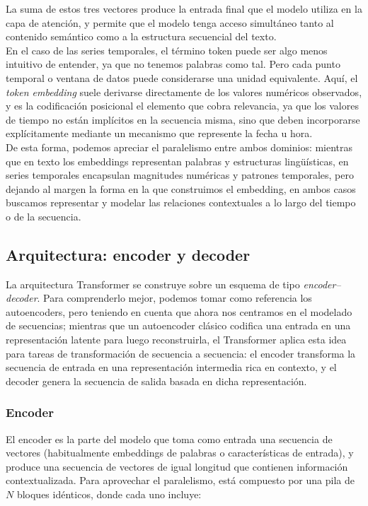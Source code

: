 La suma de estos tres vectores produce la entrada final que el modelo utiliza en la capa de atención, y permite que el modelo tenga acceso simultáneo tanto al contenido semántico como a la estructura secuencial del texto.\\

En el caso de las series temporales, el término token puede ser algo menos intuitivo de entender, ya que no tenemos palabras como tal. Pero cada punto temporal o ventana de datos puede considerarse una unidad equivalente. Aquí, el \textit{token embedding} suele derivarse directamente de los valores numéricos observados, y es la codificación posicional el elemento que cobra relevancia, ya que los valores de tiempo no están implícitos en la secuencia misma, sino que deben incorporarse explícitamente mediante un mecanismo que represente la fecha u hora.\\

De esta forma, podemos apreciar el paralelismo entre ambos dominios: mientras que en texto los embeddings representan palabras y estructuras lingüísticas, en series temporales encapsulan magnitudes numéricas y patrones temporales, pero dejando al margen la forma en la que construimos el embedding, en ambos casos buscamos representar y modelar las relaciones contextuales a lo largo del tiempo o de la secuencia.

\subsection{Arquitectura: encoder y decoder}

La arquitectura Transformer se construye sobre un esquema de tipo \textit{encoder–decoder}. Para comprenderlo mejor, podemos tomar como referencia los autoencoders, pero teniendo en cuenta que ahora nos centramos en el modelado de secuencias; mientras que un autoencoder clásico codifica una entrada en una representación latente para luego reconstruirla, el Transformer aplica esta idea para tareas de transformación de secuencia a secuencia: el encoder transforma la secuencia de entrada en una representación intermedia rica en contexto, y el decoder genera la secuencia de salida basada en dicha representación.

\subsubsection{Encoder}  
El encoder es la parte del modelo  que toma como entrada una secuencia de vectores (habitualmente embeddings de palabras o características de entrada), y produce una secuencia de vectores de igual longitud que contienen información contextualizada. Para aprovechar el paralelismo, está compuesto por una pila de $N$ bloques idénticos, donde cada uno incluye:

